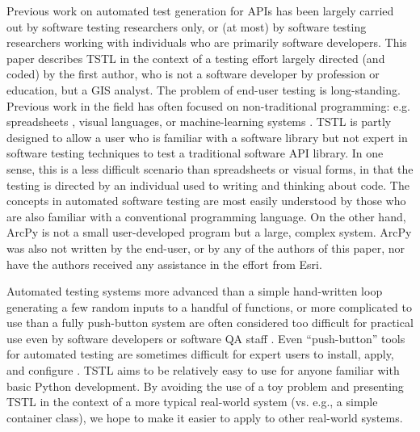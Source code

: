 
Previous work on automated test generation for APIs has been largely carried
out by software testing researchers only, or (at most) by software
testing researchers working with individuals who are primarily
software developers.  This paper describes TSTL in the context of a
testing effort largely directed (and coded) by the first author, who is not a
software developer by profession or education, but a GIS analyst.
The problem of end-user testing
\cite{burnettEUSE,Silos,rothermelTOSEM} is long-standing.  Previous
work in the field has often focused on
non-traditional programming: e.g. spreadsheets
\cite{rothermelTOSEM}, visual languages, or machine-learning systems
\cite{OnlyOracle}.  TSTL is partly designed to allow a user who is
familiar with a software library but not expert in software testing
techniques to test a traditional software API library.  In one sense,
this is a less difficult scenario than spreadsheets
or visual forms, in that the testing is directed by an individual used
to writing and thinking about code.  The concepts in
automated software testing are most easily understood by those
who are also familiar with a conventional
programming language.  On the other hand, ArcPy is
not a small user-developed program but a large, complex system.
ArcPy was also not written by the end-user, or by any of the authors
of this paper, nor have the authors received any assistance in the
effort from Esri.

Automated testing systems more advanced than a simple hand-written
loop generating a few random inputs to a handful of functions, or more
complicated to use than a fully push-button system are often
considered too difficult for practical use even by software developers
or software QA staff \cite{ISSRE12}. Even ``push-button'' tools for
automated testing are sometimes difficult for expert users to install,
apply, and configure \cite{AMAI,CFV08,ISSRE12}.  TSTL aims to be
relatively easy to use for anyone familiar with basic Python
development.  By avoiding the use of a toy problem and presenting TSTL
in the context of a more typical real-world system (vs. e.g., a simple
container class), we hope to make it easier to apply to other
real-world systems.



